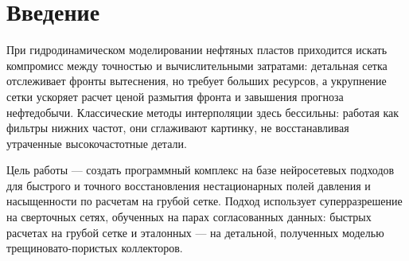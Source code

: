 \chapter{Введение}
\label{chap:intro}

При гидродинамическом моделировании нефтяных пластов приходится искать компромисс между точностью и вычислительными затратами: детальная сетка отслеживает фронты вытеснения, но требует больших ресурсов, а укрупнение сетки ускоряет расчет ценой размытия фронта и завышения прогноза нефтедобычи. Классические методы интерполяции здесь бессильны: работая как фильтры нижних частот, они сглаживают картинку, не восстанавливая утраченные высокочастотные детали.

Цель работы — создать программный комплекс на базе нейросетевых подходов для быстрого и точного восстановления нестационарных полей давления и насыщенности по расчетам на грубой сетке. Подход использует суперразрешение на сверточных сетях, обученных на парах согласованных данных: быстрых расчетах на грубой сетке и эталонных — на детальной, полученных моделью трещиновато-пористых коллекторов.